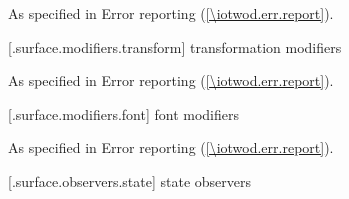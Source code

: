 \begin{itemdecl}
\end{itemdecl}
\begin{itemdescr}
\pnum
\effects


\pnum
\postconditions


\pnum
\throws
As specified in Error reporting (\ref{\iotwod.err.report}).


\pnum
\remarks


\pnum
\errors


\pnum
\realnotes


\end{itemdescr}

 [\iotwod.surface.modifiers.transform] { transformation modifiers}

\begin{itemdecl}
\end{itemdecl}
\begin{itemdescr}
\pnum
\effects


\pnum
\postconditions


\pnum
\throws
As specified in Error reporting (\ref{\iotwod.err.report}).


\pnum
\remarks


\pnum
\errors


\pnum
\realnotes


\end{itemdescr}


 [\iotwod.surface.modifiers.font] { font modifiers}

\begin{itemdecl}
\end{itemdecl}
\begin{itemdescr}
\pnum
\effects


\pnum
\postconditions


\pnum
\throws
As specified in Error reporting (\ref{\iotwod.err.report}).


\pnum
\remarks


\pnum
\errors


\pnum
\realnotes


\end{itemdescr}


 [\iotwod.surface.observers.state] { state observers}

